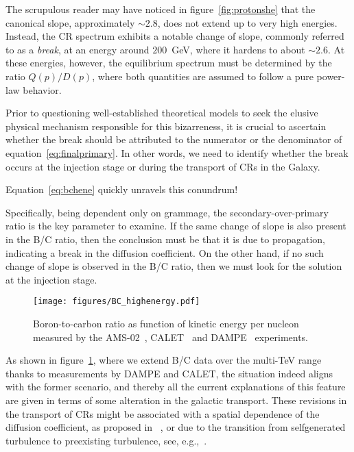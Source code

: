 The scrupulous reader may have noticed in figure~\ref{fig:protonshe} that the canonical slope, approximately $\sim 2.8$, does not extend up to very high energies. Instead, the CR spectrum exhibits a notable change of slope, commonly referred to as a \emph{break}, at an energy around $200$~GeV, where it hardens to about $\sim 2.6$.
%
At these energies, however, the equilibrium spectrum must be determined by the ratio $Q(p)/D(p)$, where both quantities are assumed to follow a pure power-law behavior. 

Prior to questioning well-established theoretical models to seek the elusive physical mechanism responsible for this bizarreness, it is crucial to ascertain whether the break should be attributed to the numerator or the denominator of equation~\eqref{eq:finalprimary}. 
%
In other words, we need to identify whether the break occurs at the injection stage or during the transport of CRs in the Galaxy.

Equation~\eqref{eq:bchene} quickly unravels this conundrum! 

Specifically, being dependent only on grammage, the secondary-over-primary ratio is the key parameter to examine. 
%
If the same change of slope is also present in the B/C ratio, then the conclusion must be that it is due to propagation, indicating a break in the diffusion coefficient. On the other hand, if no such change of slope is observed in the B/C ratio, then we must look for the solution at the injection stage.

\begin{figure}
\centering
\texttt{[image: figures/BC\_highenergy.pdf]}
\caption{Boron-to-carbon ratio as function of kinetic energy per nucleon measured by the AMS-02~\cite{AMS02results}, CALET~\cite{CALET.2022.BC} and DAMPE~\cite{DAMPE.2022.BC} experiments.}
\label{fig:bchighen}
\end{figure}

As shown in figure~\ref{fig:bchighen}, where we extend B/C data over the multi-TeV range thanks to measurements by DAMPE and CALET, the situation indeed aligns with the former scenario, and thereby all the current explanations of this feature are given in terms of some alteration in the galactic transport. 
%
These revisions in the transport of CRs might be associated with a spatial dependence of the diffusion coefficient, as proposed in ~\cite{Tomassetti2012apj}, or due to the transition from selfgenerated turbulence to preexisting turbulence, see, e.g.,~\cite{Evoli2018prl}.

